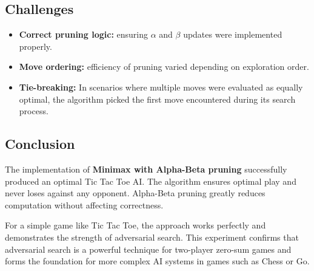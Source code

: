 \documentclass[14pt]{extreport}
\begin{document}
\vspace{1em}
\subsection*{Challenges}
\begin{itemize}
    \item \textbf{Correct pruning logic:} ensuring $\alpha$ and $\beta$ updates were implemented properly.
    \item \textbf{Move ordering:} efficiency of pruning varied depending on exploration order.
    \item \textbf{Tie-breaking:} In scenarios where multiple moves were evaluated as equally optimal, the algorithm picked the first move encountered during its search process.
\end{itemize}

\vspace{1em}
\subsection*{Conclusion}
The implementation of \textbf{Minimax with Alpha-Beta pruning} successfully produced an optimal Tic Tac Toe AI. 
The algorithm ensures optimal play and never loses against any opponent. 
Alpha-Beta pruning greatly reduces computation without affecting correctness. 

For a simple game like Tic Tac Toe, the approach works perfectly and demonstrates the strength of adversarial search. 
This experiment confirms that adversarial search is a powerful technique for two-player zero-sum games and forms 
the foundation for more complex AI systems in games such as Chess or Go.
\end{document}

